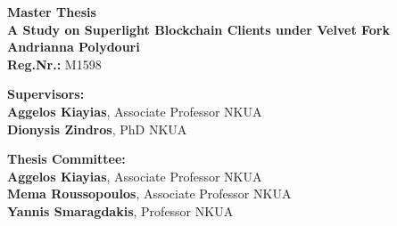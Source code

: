\begin{center}
    \vspace{3cm}
    \large \textbf{Master Thesis}\\
    \vspace{3cm}
    \textbf{A Study on Superlight Blockchain Clients under Velvet Fork}\\
    \vspace{3cm}
    \large \textbf{Andrianna Polydouri}\\
    \textbf{Reg.Nr.:} M1598
 
    \begin{flushleft}
        \textbf{Supervisors:}\\ 
        \hspace{2cm}
        \textbf{Aggelos Kiayias}, Associate Professor NKUA\\
        \hspace{2cm}
        \textbf{Dionysis Zindros}, PhD NKUA

        \textbf{Thesis Committee:}\\ 
        \hspace{2cm}
        \textbf{Aggelos Kiayias}, Associate Professor NKUA\\
        \hspace{2cm}
        \textbf{Mema Roussopoulos}, Associate Professor NKUA\\
        \hspace{2cm}
        \textbf{Yannis Smaragdakis}, Professor NKUA

    \end{flushleft}
\end{center}


\pagebreak